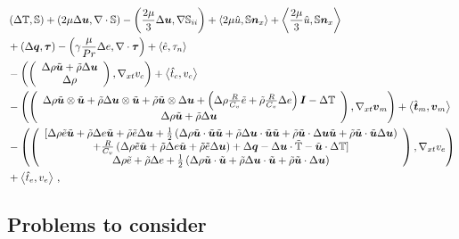 \documentclass[Proposal.tex]{subfiles}
\begin{document}
\begin{equation}
\label{eq:compressibleJacobian}
\begin{aligned}
	&\LRp{\Delta\mathbb{T},\mathbb{S}}+\LRp{2\mu\Delta\bfu,\Div\mathbb{S}}-\LRp{\frac{2\mu}{3}\Delta\bfu,\Grad\mathbb{S}_{ii}}
	+\LRa{2\mu\hat u,\mathbb{S}\bfn_x}+\LRa{\frac{2\mu}{3}\hat u,\mathbb{S}\bfn_x}\\
	&+\LRp{\Delta\bfq,\bftau}-\LRp{\gamma\frac{\mu}{Pr}\Delta e,\Div\bftau}+\LRa{\hat e,\tau_n}\\
	&-\LRp{\vecttwo{\Delta\rho\tilde\bfu+\tilde\rho\Delta\bfu}
	{\Delta\rho},\Gradxt v_c}
	+\LRa{\hat t_c,v_c}\\
	&-\LRp{\vecttwo{\Delta\rho\tilde\bfu\otimes\tilde\bfu+\tilde\rho\Delta\bfu\otimes\tilde\bfu+\tilde\rho\tilde\bfu\otimes\Delta\bfu
	+\LRp{\Delta\rho\frac{R}{C_v}\tilde e+\tilde\rho\frac{R}{C_v}\Delta e}\bfI-\Delta\mathbb{T}}
	{\Delta\rho\tilde\bfu+\tilde\rho\Delta\bfu},\Gradxt\bfv_m}
	+\LRa{\hat\bft_m,\bfv_m}\\
	&-\LRp{\vectthree{[\Delta\rho\tilde e\tilde\bfu+\tilde\rho\Delta e\tilde\bfu+\tilde\rho\tilde e\Delta\bfu
	+\frac{1}{2}\LRp{\Delta\rho\tilde\bfu\cdot\tilde\bfu\tilde\bfu+\tilde\rho\Delta\bfu\cdot\tilde\bfu\tilde\bfu
	+\tilde\rho\tilde\bfu\cdot\Delta\bfu\tilde\bfu+\tilde\rho\tilde\bfu\cdot\tilde\bfu\Delta\bfu}}
	{+\frac{R}{C_v}\LRp{\Delta\rho\tilde e\tilde\bfu+\tilde\rho\Delta e\tilde\bfu+\tilde\rho\tilde e\Delta\bfu}
	+\Delta\bfq-\Delta\bfu\cdot\tilde{\mathbb{T}}-\tilde\bfu\cdot\Delta\mathbb{T}]}
	{\Delta\rho\tilde e+\tilde\rho\Delta e
	+\frac{1}{2}\LRp{\Delta\rho\tilde\bfu\cdot\tilde\bfu+\tilde\rho\Delta\bfu\cdot\tilde\bfu+\tilde\rho\tilde\bfu\cdot\Delta\bfu}},\Gradxt v_e}\\
	&+\LRa{\hat t_e,v_e}\,,
\end{aligned}
\end{equation}

\subsection{Problems to consider}
\end{document}
